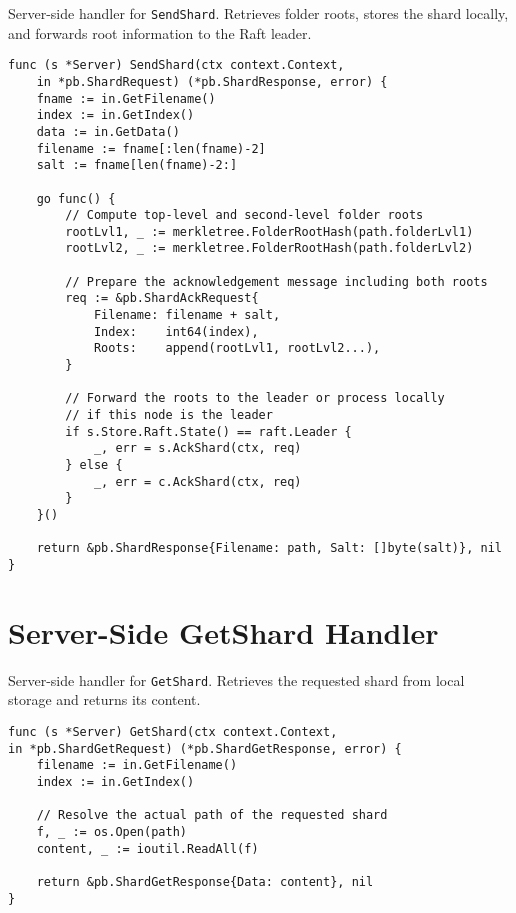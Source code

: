 \begin{listing}[H]
\caption{Server-side handler for \texttt{SendShard}. Retrieves folder roots, stores the shard locally, and forwards root information to the Raft leader.}
\begin{verbatim}
func (s *Server) SendShard(ctx context.Context,
    in *pb.ShardRequest) (*pb.ShardResponse, error) {
    fname := in.GetFilename()
    index := in.GetIndex()
    data := in.GetData()
    filename := fname[:len(fname)-2]
    salt := fname[len(fname)-2:]

    go func() {
        // Compute top-level and second-level folder roots
        rootLvl1, _ := merkletree.FolderRootHash(path.folderLvl1)
        rootLvl2, _ := merkletree.FolderRootHash(path.folderLvl2)

        // Prepare the acknowledgement message including both roots
        req := &pb.ShardAckRequest{
            Filename: filename + salt,
            Index:    int64(index),
            Roots:    append(rootLvl1, rootLvl2...),
        }

        // Forward the roots to the leader or process locally 
        // if this node is the leader
        if s.Store.Raft.State() == raft.Leader {
            _, err = s.AckShard(ctx, req)
        } else {
            _, err = c.AckShard(ctx, req)
        }
    }()

    return &pb.ShardResponse{Filename: path, Salt: []byte(salt)}, nil
}
\end{verbatim}
\end{listing}

\section{Server-Side GetShard Handler} \label{code:get-shard-server}
\begin{listing}
\caption{Server-side handler for \texttt{GetShard}. Retrieves the requested shard from local storage and returns its content.}
\begin{verbatim}
func (s *Server) GetShard(ctx context.Context,
in *pb.ShardGetRequest) (*pb.ShardGetResponse, error) {
    filename := in.GetFilename()
    index := in.GetIndex()

    // Resolve the actual path of the requested shard
    f, _ := os.Open(path)
    content, _ := ioutil.ReadAll(f)

    return &pb.ShardGetResponse{Data: content}, nil
}
\end{verbatim}
\end{listing}


